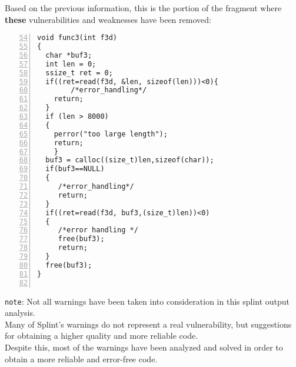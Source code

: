 \documentclass[a4paper,12pt]{article}
\newenvironment{SpecialPar}
  {\begin{shaded}}
  {\end{shaded}}
\begin{document}
\newpage
\noindent
Based on the previous information, this is the portion of the fragment where \textbf{these} vulnerabilities and weaknesses have been removed:
\begin{lstlisting}[style=c,numbers=left,firstnumber=54,linebackgroundcolor={
\ifnum\value{lstnumber}=59\color{green}\fi
\ifnum\value{lstnumber}=69\color{green}\fi
\ifnum\value{lstnumber}=74\color{green}\fi
\ifnum\value{lstnumber}=77\color{green}\fi
\ifnum\value{lstnumber}=80\color{green}\fi}]
void func3(int f3d)
{
  char *buf3;
  int len = 0;
  ssize_t ret = 0;
  if((ret=read(f3d, &len, sizeof(len)))<0){
        /*error_handling*/
	return;
  }
  if (len > 8000) 
  { 
  	perror("too large length");
  	return; 
	}
  buf3 = calloc((size_t)len,sizeof(char));
  if(buf3==NULL)
  {
     /*error_handling*/
     return;
  }
  if((ret=read(f3d, buf3,(size_t)len))<0)
  {
     /*error handling */
     free(buf3);
     return;
  }
  free(buf3);        
}


\end{lstlisting}

\begin{SpecialPar}
\noindent
\texttt{note}: Not all warnings have been taken into consideration in this splint output analysis.\\

Many of Splint's warnings do not represent a real vulnerability, but suggestions for obtaining a higher quality and more reliable code.\\
Despite this, most of the warnings have been analyzed and solved in order to obtain a more reliable and error-free code.
\end{SpecialPar}
\end{document}
